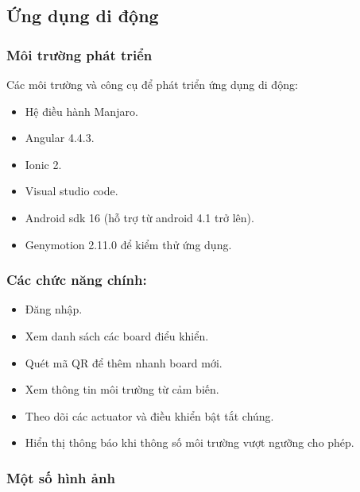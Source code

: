 \documentclass[a4paper,12pt,oneside]{article}
\begin{document}
\subsection{Ứng dụng di động}
\subsubsection{Môi trường phát triển}
Các môi trường và công cụ để phát triển ứng dụng di động:
\begin{itemize}
\item Hệ điều hành Manjaro.
\item Angular 4.4.3.
\item Ionic 2.
\item Visual studio code.
\item Android sdk 16 (hỗ trợ từ android 4.1 trở lên).
\item Genymotion 2.11.0 để kiểm thử ứng dụng.
\end{itemize}

\subsubsection{Các chức năng chính:}

	\begin{itemize}
		\item Đăng nhập.
		\item Xem danh sách các board điểu khiển.
		\item Quét mã QR để thêm nhanh board mới.
		\item Xem thông tin môi trường từ cảm biến.
		\item Theo dõi các actuator và điều khiển bật tắt chúng.
		\item Hiển thị thông báo khi thông số môi trường vượt ngưỡng cho phép.
	\end{itemize}

\subsubsection{Một số hình ảnh}
\end{document}
